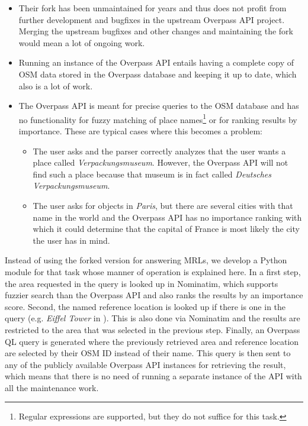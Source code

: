 \begin{itemize}
\item Their fork has been unmaintained for years and thus does not profit from
  further development and bugfixes in the upstream Overpass API project. Merging
  the upstream bugfixes and other changes and maintaining the fork would mean a
  lot of ongoing work.
\item Running an instance of the Overpass API entails having a complete copy of
  OSM data stored in the Overpass database and keeping it up to date, which also
  is a lot of work.
\item The Overpass API is meant for precise queries to the OSM database and has
  no functionality for fuzzy matching of place names\footnote{Regular
    expressions are supported, but they do not suffice for this task.} or for
  ranking results by importance. These are typical cases where this becomes a
  problem:
  \begin{itemize}
  \item The user asks  and the parser
    correctly analyzes that the user wants a place called
    \emph{Verpackungsmuseum}. However, the Overpass API will not find such a
    place because that museum is in fact called \emph{Deutsches
      Verpackungsmuseum}.
  \item The user asks for objects in \emph{Paris}, but there are several cities
    with that name in the world and the Overpass API has no importance ranking
    with which it could determine that the capital of France is most likely the
    city the user has in mind.
  \end{itemize}
\end{itemize}

Instead of using the forked version for answering MRLs, we develop a Python
module for that task whose manner of operation is explained here. In a first
step, the area requested in the query is looked up in Nominatim, which supports
fuzzier search than the Overpass API and also ranks the results by an importance
score. Second, the named reference location is looked up if there is one in the
query (e.g. \emph{Eiffel Tower} in ). This
is also done via Nominatim and the results are restricted to the area that was
selected in the previous step. Finally, an Overpass QL query is generated where
the previously retrieved area and reference location are selected by their OSM
ID instead of their name. This query is then sent to any of the publicly
available Overpass API instances for retrieving the result, which means that
there is no need of running a separate instance of the API with all the
maintenance work.


